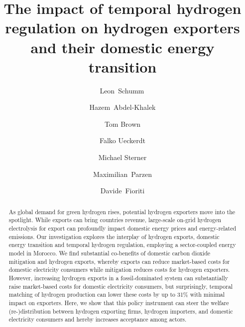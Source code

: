 \documentclass[5p,numafflabel]{elsarticle}
\begin{document}
\begin{frontmatter}

	\title{The impact of temporal hydrogen regulation on hydrogen exporters and their domestic energy transition}

    
	\author[oth,tub,lead]{Leon~Schumm\,}
	\author[ieg,alu]{Hazem~Abdel-Khalek}
	\author[tub]{Tom Brown}
	\author[pik]{Falko Ueckerdt}
	\author[oth]{Michael Sterner}
	\author[uoe]{Maximilian~Parzen}
	\author[unipi]{Davide~Fioriti}


	\address[oth]{Research Center on Energy Transmission and Storage (FENES), Faculty of Electrical and Information Technology, University of Applied Sciences (OTH) Regensburg, Seybothstr. 2, 93053 Regensburg, Germany}
	\address[tub]{Department of Digital Transformation in Energy Systems, Institute of Energy Technology, Technische Universität Berlin, Fakultät III, Einsteinufer 25 (TA 8), 10587 Berlin, Germany}
	\address[ieg]{Fraunhofer Research Institution for Energy Infrastructures and Geothermal Systems IEG, Gulbener Straße 23, 03046 Cottbus, Germany}
	\address[alu]{Albert-Ludwigs Universität Freiburg, Faculty of Environment and Natural Resources, Tennenbacher Str. 4, 79106 Freiburg im Breisgau, Germany}
	\address[pik]{Potsdam Institute for Climate Impact Research, Telegrafenberg, 14473 Potsdam, Germany}
	\address[uoe]{University of Edinburgh, Institute for Energy Systems, EH9 3DW Edinburgh, United Kingdom}
	\address[unipi]{University of Pisa, Department of Energy Systems, Territory and Construction Engineering, Largo Lucio Lazzarino, 56122 Pisa, Italy}
	\address[lead]{Lead contact}

	\begin{abstract}

As global demand for green hydrogen rises, potential hydrogen exporters move into the spotlight.
While exports can bring countries revenue, large-scale on-grid hydrogen electrolysis for export can profoundly impact domestic energy prices and energy-related emissions.
Our investigation explores the interplay of hydrogen exports, domestic energy transition and temporal hydrogen regulation, employing a sector-coupled energy model in Morocco. 
We find substantial co-benefits of domestic carbon dioxide mitigation and hydrogen exports, whereby exports can reduce market-based costs for domestic electricity consumers while mitigation reduces costs for hydrogen exporters.
However, increasing hydrogen exports in a fossil-dominated system can substantially raise market-based costs for domestic electricity consumers, but surprisingly, temporal matching of hydrogen production can lower these costs by up to 31\% with minimal impact on exporters.
Here, we show that this policy instrument can steer the welfare (re-)distribution between hydrogen exporting firms, hydrogen importers, and domestic electricity consumers and hereby increases acceptance among actors.


\end{abstract}
\end{frontmatter}
\end{document}
